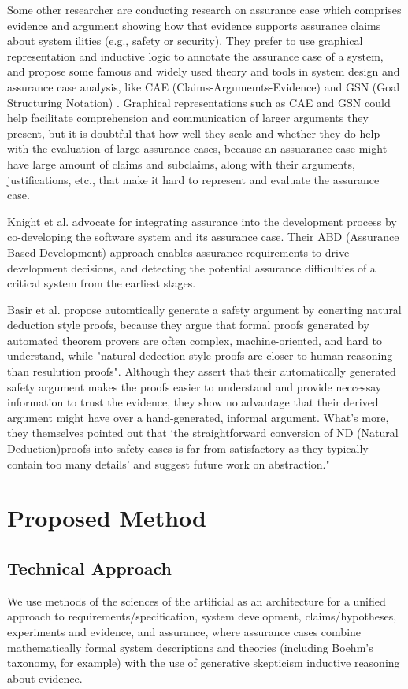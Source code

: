 \documentclass{article} %
\begin{document}
Some other researcher are conducting research on assurance case which comprises evidence and argument showing how that evidence supports assurance claims about system ilities (e.g., safety or security). They prefer to use graphical representation and inductive logic to annotate the assurance case of a system, and propose some famous and widely used theory and tools in system design and assurance case analysis, like CAE (Claims-Argumemts-Evidence) \cite{Bloomfied:cae} and GSN (Goal Structuring Notation) \cite{Kelly:gsn}. Graphical representations such as CAE and GSN could help facilitate comprehension and communication of larger arguments they present, but it is doubtful that how well they scale and whether they do help with the evaluation of large assurance cases, because an assuarance case might have large amount of claims and subclaims, along with their arguments, justifications, etc., that make it hard to represent and evaluate the assurance case.

Knight et al. advocate for integrating assurance into the development process by co-developing the software system and its assurance case. Their ABD (Assurance Based Development) approach enables assurance requirements to drive development decisions, and detecting the potential assurance difficulties of a critical system from the earliest stages\cite{Knight:assurance}.

Basir et al. propose automtically generate  a safety argument by conerting natural deduction style proofs, because they argue that formal proofs generated by automated theorem provers are often complex, machine-oriented, and hard to understand, while "natural dedection style proofs are closer to human reasoning than resulution proofs". Although they assert that their automatically generated safety argument makes the proofs easier to understand and provide neccessay information to trust the evidence, they show no advantage that their derived argument might have over a hand-generated, informal argument. What's more, they themselves pointed out that ‘the straightforward conversion of ND (Natural Deduction)proofs into safety cases is far from satisfactory as they typically contain too many details’ and suggest future work on abstraction."\cite{Basir:safety}


\section{Proposed Method}

\subsection{Technical Approach}
We use methods of the sciences of the artificial as an architecture for a unified approach to requirements/specification, system development, claims/hypotheses, experiments and evidence, and assurance, where assurance cases combine mathematically formal system descriptions and theories (including Boehm's taxonomy, for example) with the use of generative skepticism inductive reasoning about evidence.
\end{document}
